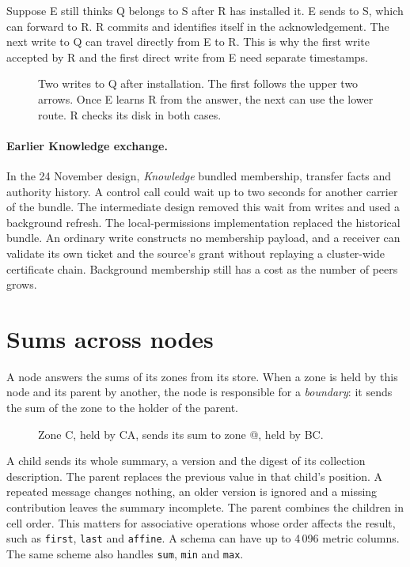 \documentclass[11pt]{article}
\begin{document}
Suppose E still thinks Q belongs to S after R has installed it. E sends to S, which can forward to R. R commits and identifies itself in the acknowledgement. The next write to Q can travel directly from E to R. This is why the first write accepted by R and the first direct write from E need separate timestamps.

\begin{figure}[H]
    \centering
    \caption{Two writes to Q after installation. The first follows the upper two arrows. Once E learns R from the answer, the next can use the lower route. R checks its disk in both cases.}
\end{figure}

\paragraph{Earlier Knowledge exchange.}
In the 24 November design, \emph{Knowledge} bundled membership, transfer facts and authority history. A control call could wait up to two seconds for another carrier of the bundle. The intermediate design removed this wait from writes and used a background refresh. The local-permissions implementation replaced the historical bundle. An ordinary write constructs no membership payload, and a receiver can validate its own ticket and the source's grant without replaying a cluster-wide certificate chain. Background membership still has a cost as the number of peers grows.

\section{Sums across nodes}\hypertarget{ix:summaries}{}
A node answers the sums of its zones from its store. When a zone is held by this node and its parent by another, the node is responsible for a \emph{boundary}: it sends the sum of the zone to the holder of the parent.

\begin{figure}[H]
    \centering
    \caption{Zone C, held by CA, sends its sum to zone @, held by BC.}
\end{figure}

A child sends its whole summary, a version and the digest of its collection description. The parent replaces the previous value in that child's position. A repeated message changes nothing, an older version is ignored and a missing contribution leaves the summary incomplete. The parent combines the children in cell order. This matters for associative operations whose order affects the result, such as \texttt{first}, \texttt{last} and \texttt{affine}. A schema can have up to 4\,096 metric columns. The same scheme also handles \texttt{sum}, \texttt{min} and \texttt{max}.
\end{document}

